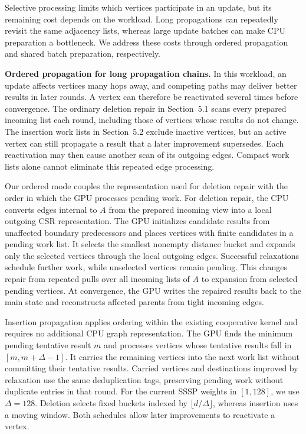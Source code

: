 Selective processing limits which vertices participate in an update, but its remaining cost depends on the workload. Long propagations can repeatedly revisit the same adjacency lists, whereas large update batches can make CPU preparation a bottleneck. We address these costs through ordered propagation and shared batch preparation, respectively.

\textbf{Ordered propagation for long propagation chains.} In this workload, an update affects vertices many hops away, and competing paths may deliver better results in later rounds. A vertex can therefore be reactivated several times before convergence. The ordinary deletion repair in Section~5.1 scans every prepared incoming list each round, including those of vertices whose results do not change. The insertion work lists in Section~5.2 exclude inactive vertices, but an active vertex can still propagate a result that a later improvement supersedes. Each reactivation may then cause another scan of its outgoing edges. Compact work lists alone cannot eliminate this repeated edge processing.

Our ordered mode couples the representation used for deletion repair with the order in which the GPU processes pending work. For deletion repair, the CPU converts edges internal to $A$ from the prepared incoming view into a local outgoing CSR representation. The GPU initializes candidate results from unaffected boundary predecessors and places vertices with finite candidates in a pending work list. It selects the smallest nonempty distance bucket and expands only the selected vertices through the local outgoing edges. Successful relaxations schedule further work, while unselected vertices remain pending. This changes repair from repeated pulls over all incoming lists of $A$ to expansion from selected pending vertices. At convergence, the GPU writes the repaired results back to the main state and reconstructs affected parents from tight incoming edges.

Insertion propagation applies ordering within the existing cooperative kernel and requires no additional CPU graph representation. The GPU finds the minimum pending tentative result $m$ and processes vertices whose tentative results fall in $[m,m+\Delta-1]$. It carries the remaining vertices into the next work list without committing their tentative results. Carried vertices and destinations improved by relaxation use the same deduplication tags, preserving pending work without duplicate entries in that round. For the current SSSP weights in $[1,128]$, we use $\Delta=128$. Deletion selects fixed buckets indexed by $\lfloor d/\Delta\rfloor$, whereas insertion uses a moving window. Both schedules allow later improvements to reactivate a vertex.

